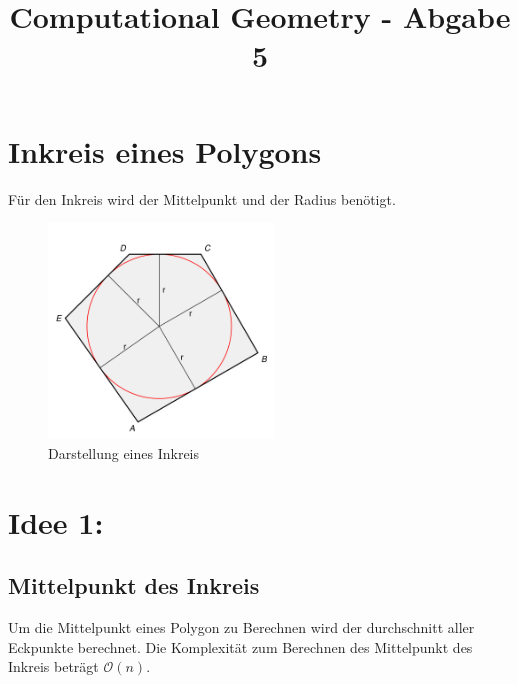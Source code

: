 \documentclass[conference]{IEEEtran}
\begin{document}
	
	\title{Computational Geometry - Abgabe 5}
	
	\author{
	}
	
	\maketitle
	
	\begin{abstract}
		
		
	\end{abstract}
	
	\section{Inkreis eines Polygons}
	Für den Inkreis wird der Mittelpunkt und der Radius benötigt.
	\begin{figure}[h]
		\begin{center}
			\includegraphics[width=6cm]{Pentagon-inscribed-circle.svg.png}
			\caption{Darstellung eines Inkreis \cite{b1}}
			\label{inkreis}
		\end{center}
	\end{figure}
	
	\section{Idee 1:}
	\subsection{Mittelpunkt des Inkreis}
	Um die Mittelpunkt eines Polygon zu Berechnen wird der durchschnitt aller Eckpunkte berechnet.
	Die Komplexität zum Berechnen des Mittelpunkt des Inkreis beträgt $\mathcal{O}(n)$. 
\end{document}
